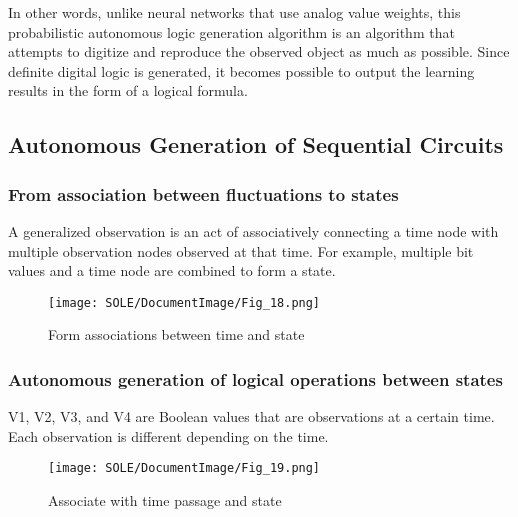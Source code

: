 \documentclass[12pt]{article}
\begin{document}
In other words, unlike neural networks that use analog value weights,
this probabilistic autonomous logic generation algorithm is an algorithm
that attempts to digitize and reproduce the observed object as much as
possible. Since definite digital logic is generated, it becomes possible
to output the learning results in the form of a logical formula.

\subsection{Autonomous Generation of Sequential
Circuits}\label{autonomous-generation-of-sequential-circuits}

\subsubsection{From association between fluctuations to
states}\label{from-association-between-fluctuations-to-states}

A generalized observation is an act of associatively connecting a time
node with multiple observation nodes observed at that time. For example,
multiple bit values \hspace{0pt}\hspace{0pt}and a time node are combined
to form a state.

\begin{figure}[ht]
  \centering
  \texttt{[image: SOLE/DocumentImage/Fig\_18.png]}
  \caption{Form associations between time and state}
  \label{fig:form_associations_between_time_and_state}
\end{figure}

\subsubsection{Autonomous generation of logical operations between
states}\label{autonomous-generation-of-logical-operations-between-states}

V1, V2, V3, and V4 are Boolean values \hspace{0pt}\hspace{0pt}that are
observations at a certain time. Each observation is different depending
on the time.

\begin{figure}[ht]
  \centering
  \texttt{[image: SOLE/DocumentImage/Fig\_19.png]}
  \caption{Associate with time passage and state}
  \label{fig:associate_with_time_passage_and_state}
\end{figure}
\end{document}
